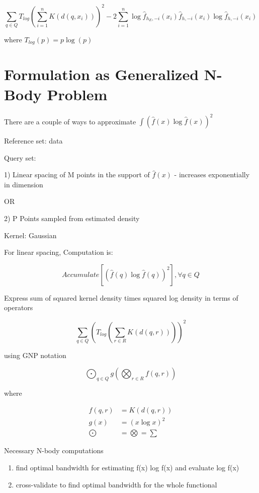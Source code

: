 \documentclass{amsart}
\begin{document}
\begin{displaymath}
\sum_{q \in Q} T_{log}(\sum_{i=1}^n K(d(q,x_i)))^2 - 2 \sum_{i=1}^n \log \hat{f}_{h_E,-i}(x_i) \hat{f}_{h,-i}(x_i) \log \hat{f}_{h,-i}(x_i)
\end{displaymath}

where $ T_{log}(p) = p \log(p) $


\section{Formulation as Generalized N-Body Problem}

There are a couple of ways to approximate $ \int (\hat{f}(x) \log \hat{f}(x))^2  $


Reference set: data


Query set:

1) Linear spacing of M points in the support of $ \hat{f}(x) $ - increases exponentially in dimension

OR 

2) P Points sampled from estimated density


Kernel: Gaussian

For linear spacing, Computation is:

\begin{displaymath}
Accumulate[(\hat{f}(q) \log \hat{f}(q))^2] , \forall q \in Q 
\end{displaymath}

Express sum of squared kernel density times squared log density in terms of operators

\begin{displaymath}
\sum_{q \in Q} (T_{log}(\sum_{r \in R} K(d(q,r))))^2
\end{displaymath}

using GNP notation

\begin{displaymath}
\bigodot_{q \in Q} g\left(\bigotimes_{r \in R} f(q,r)\right)
\end{displaymath}

where

\begin{align*}
f(q,r) & = K(d(q,r))\\
g(x) & = (x \log x)^2\\
\bigodot & = \bigotimes = \sum
\end{align*}



Necessary N-body computations
\begin{enumerate}
\item find optimal bandwidth for estimating f(x) log f(x) and evaluate log f(x)
\item cross-validate to find optimal bandwidth for the whole functional
\end{enumerate}
\end{document}

